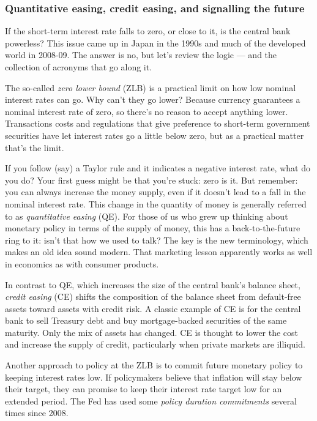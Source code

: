 \documentclass[letterpaper,12pt]{article}
\begin{document}
\subsubsection*{Quantitative easing, credit easing, and signalling the future}

If the short-term interest rate falls to zero, or close to it,
is the central bank powerless?
This issue came up in Japan in the 1990s and
much of the developed world in 2008-09.
The answer is no, but let's review the logic
--- and the collection of acronyms that go along it. 

The so-called {\it zero lower bound\/} (ZLB) is a practical
limit on how low nominal interest rates can go.
Why can't they go lower?
Because currency guarantees a nominal interest rate of zero,
so there's no reason to accept anything lower.
Transactions costs and regulations that give preference
to short-term government securities have let interest rates
go a little below zero, but as a practical matter that's the limit.

If you follow (say) a Taylor rule and it indicates a negative interest rate,
what do you do?
Your first guess might be that you're stuck:  zero is it.
But remember:  you can always increase the money supply,
even if it doesn't lead to a fall in the nominal interest rate.
This change in the quantity of money is generally referred to as
{\it quantitative easing\/} (QE).
For those of us who grew up thinking about monetary policy in
terms of the supply of money,
this has a back-to-the-future ring to it:
isn't that how we used to talk?
The key is the new terminology,
which makes an old idea sound modern.
That marketing lesson apparently works as well in economics
as with consumer products.

In contrast to QE, which increases the size of the central bank's
balance sheet, 
{\it credit easing\/} (CE) shifts the composition of the balance sheet
from default-free assets toward assets with credit risk.  
A classic example of CE is for the central bank to sell Treasury debt 
and buy mortgage-backed securities of the same maturity.  
Only the mix of assets has changed.  
CE is thought to lower the cost and increase the supply of credit, 
particularly when private markets are illiquid.  

Another approach to policy at the ZLB is to commit future monetary 
policy to keeping interest rates low.  
If policymakers believe that inflation will stay below their target, 
they can promise to keep their interest rate target low
for an extended period.  
The Fed has used some {\it policy duration commitments\/}
several times since 2008.  
\end{document}
